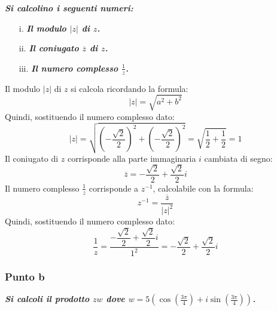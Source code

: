 \documentclass[a4paper]{article}
\begin{document}
	\textcolor{Green4}{\textbf{\emph{Si calcolino i seguenti numeri:}}}
	\begin{enumerate}
		\item[i.] \textcolor{Green4}{\textbf{\emph{Il modulo $|z|$ di $z$.}}}
		
		\item[ii.] \textcolor{Green4}{\textbf{\emph{Il coniugato $\overline{z}$ di $z$.}}}
		
		\item[iii.] \textcolor{Green4}{\textbf{\emph{Il numero complesso $\frac{1}{z}$.}}}
	\end{enumerate}
	Il modulo $|z|$ di $z$ si calcola ricordando la formula:
	\begin{equation*}
		|z| = \sqrt{a^{2} + b^{2}}
	\end{equation*}
	Quindi, sostituendo il numero complesso dato:
	\begin{equation*}
		|z| = \sqrt{\left(-\dfrac{\sqrt{2}}{2}\right)^{2} + \left(-\dfrac{\sqrt{2}}{2}\right)^{2}} = \sqrt{\dfrac{1}{2} + \dfrac{1}{2}} = 1
	\end{equation*}
	Il coniugato di $z$ corrisponde alla parte immaginaria $i$ cambiata di segno:
	\begin{equation*}
		\overline{z} = -\frac{\sqrt{2}}{2} + \frac{\sqrt{2}}{2}i
	\end{equation*}
	Il numero complesso $\frac{1}{z}$ corrisponde a $z^{-1}$, calcolabile con la formula:
	\begin{equation*}
		z^{-1} = \dfrac{\overline{z}}{|z|^{2}}
	\end{equation*}
	Quindi, sostituendo il numero complesso dato:
	\begin{equation*}
		\dfrac{1}{z} = \dfrac{-\dfrac{\sqrt{2}}{2} + \dfrac{\sqrt{2}}{2}i}{1^{2}} = -\dfrac{\sqrt{2}}{2} + \dfrac{\sqrt{2}}{2}i
	\end{equation*}\newpage
	
	\subsubsection{Punto b}
	
	\textcolor{Green4}{\textbf{\emph{Si calcoli il prodotto $zw$ dove $w = 5\left(\cos\left(\frac{3\pi}{4}\right) + i \sin\left(\frac{3\pi}{4}\right)\right)$.}}}\newline
	
\end{document}
